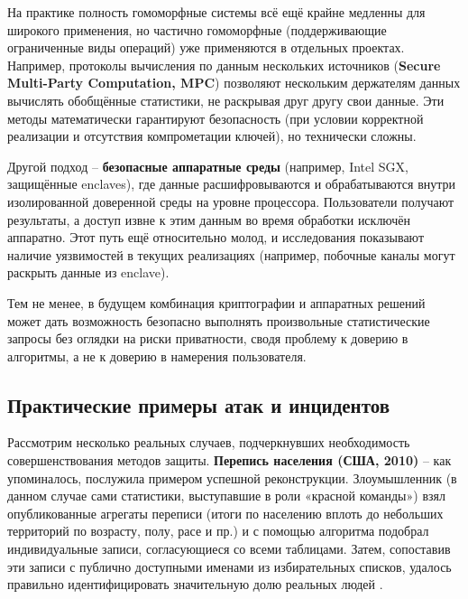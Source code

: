 На практике полность
гомоморфные системы всё ещё крайне медленны для широкого применения, но частично гомоморфные (поддерживающие
ограниченные виды операций) уже применяются в отдельных проектах. Например, протоколы вычисления по данным нескольких
источников (\textbf{Secure Multi-Party Computation, MPC}) позволяют нескольким держателям данных вычислять обобщённые
статистики, не раскрывая друг другу свои данные. Эти методы математически гарантируют безопасность (при условии
корректной реализации и отсутствия компрометации ключей), но технически сложны.

Другой подход – \textbf{безопасные аппаратные среды} (например, Intel SGX, защищённые enclaves), где данные расшифровываются и 
обрабатываются внутри изолированной доверенной среды на уровне процессора. Пользователи получают результаты, а доступ извне к этим
данным во время обработки исключён аппаратно. Этот путь ещё относительно молод, и исследования показывают наличие уязвимостей в
текущих реализациях (например, побочные каналы могут раскрыть данные из enclave).

Тем не менее, в будущем комбинация
криптографии и аппаратных решений может дать возможность безопасно выполнять произвольные статистические запросы без
оглядки на риски приватности, сводя проблему к доверию в алгоритмы, а не к доверию в намерения пользователя.

\subsection{Практические примеры атак и инцидентов}
Рассмотрим несколько реальных случаев, подчеркнувших необходимость совершенствования методов защиты. \textbf{Перепись
населения (США, 2010)} – как упоминалось, послужила примером успешной реконструкции. Злоумышленник (в данном случае сами
статистики, выступавшие в роли «красной команды») взял опубликованные агрегаты переписи (итоги по населению вплоть до
небольших территорий по возрасту, полу, расе и пр.) и с помощью алгоритма подобрал индивидуальные записи, согласующиеся
со всеми таблицами. Затем, сопоставив эти записи с публично доступными именами из избирательных списков, удалось
правильно идентифицировать значительную долю реальных людей \autocite{cornell-edu}.

